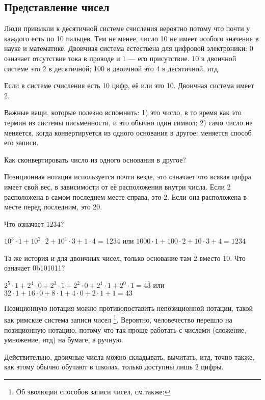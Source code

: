 \subsection{Представление чисел}

Люди привыкли к десятичной системе счисления вероятно потому что почти у каждого есть по 10 пальцев.
Тем не менее, число 10 не имеет особого значения в науке и математике.
Двоичная система естествена для цифровой электроники: 0 означает отсутствие тока в проводе и 1 --- его присутствие.
10 в двоичной системе это 2 в десятичной; 100 в двоичной это 4 в десятичной, итд.

Если в системе счисления есть 10 цифр, её  или  это 10.
Двоичная система имеет  2.

Важные вещи, которые полезно вспомнить:
1)  это число, в то время как  это термин из системы письменности, и это обычно один символ;
2) само число не меняется, когда конвертируется из одного основания в другое: меняется способ его записи.

Как сконвертировать число из одного основания в другое?

Позиционная нотация используется почти везде, это означает что всякая цифра имеет свой вес, в зависимости от её расположения
внутри числа.
Если 2 расположена в самом последнем месте справа, это 2.
Если она расположена в месте перед последним, это 20.

Что означает $1234$?

$10^3 \cdot 1 + 10^2 \cdot 2 + 10^1 \cdot 3 + 1 \cdot 4$ = 1234 или
$1000 \cdot 1 + 100 \cdot 2 + 10 \cdot 3 + 4 = 1234$

Та же история и для двоичных чисел, только основание там 2 вместо 10.
Что означает 0b101011?

$2^5 \cdot 1 + 2^4 \cdot 0 + 2^3 \cdot 1 + 2^2 \cdot 0 + 2^1 \cdot 1 + 2^0 \cdot 1 = 43$ или
$32 \cdot 1 + 16 \cdot 0 + 8 \cdot 1 + 4 \cdot 0 + 2 \cdot 1 + 1 = 43$

Позиционную нотация можно противопоставить непозиционной нотации, такой как римские система записи чисел
\footnote{Об эволюции способов записи чисел, см.также: }.
Вероятно, человечество перешло на позиционную нотацию, потому что так проще работать с числами (сложение, умножение, итд)
на бумаге, в ручную.

Действительно, двоичные числа можно складывать, вычитать, итд, точно также, как этому обычно обучают в школах,
только доступны лишь 2 цифры.

